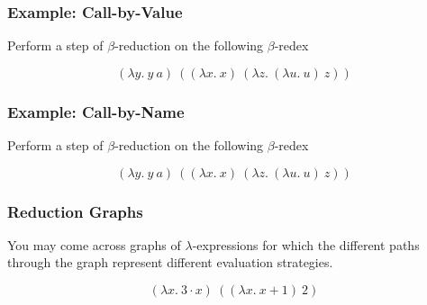 \documentclass{beamer}
\begin{document}
\begin{frame}
	\frametitle{Example: Call-by-Value}

	Perform a step of $\beta$-reduction on the following $\beta$-redex

	$$(\lambda y. \ y \ a) \ ((\lambda x. \ x) \ (\lambda z. \ (\lambda u. \ u) \ z))$$

	\vspace{7cm}	
		
\end{frame}

\begin{frame}
	\frametitle{Example: Call-by-Name}

	Perform a step of $\beta$-reduction on the following $\beta$-redex

	$$(\lambda y. \ y \ a) \ ((\lambda x. \ x) \ (\lambda z. \ (\lambda u. \ u) \ z))$$

	\vspace{7cm}	
		
\end{frame}

\begin{frame}
	\frametitle{Reduction Graphs}

	You may come across graphs of $\lambda$-expressions for which the different paths through the graph represent different evaluation strategies. 

	$$(\lambda x. \ 3\cdot x) \ ((\lambda x. \ x + 1) \ 2) $$
	\vspace{5cm}

\end{frame}
\end{document}
